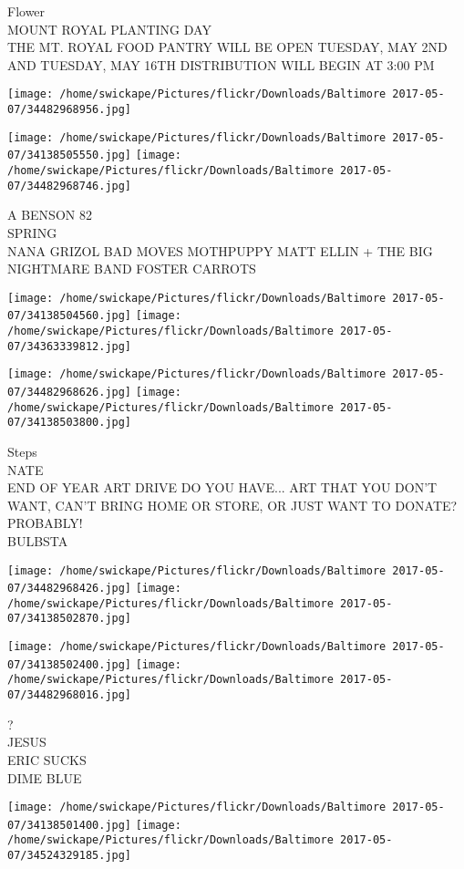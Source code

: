 \documentclass[10pt,letterpaper]{article}
\begin{document}
Flower\\
MOUNT ROYAL PLANTING DAY\\
THE MT. ROYAL FOOD PANTRY WILL BE OPEN TUESDAY, MAY 2ND AND TUESDAY, MAY 16TH DISTRIBUTION WILL BEGIN AT 3:00 PM
\pagebreak

\texttt{[image: /home/swickape/Pictures/flickr/Downloads/Baltimore 2017-05-07/34482968956.jpg]}

\vspace{0.25in}
\texttt{[image: /home/swickape/Pictures/flickr/Downloads/Baltimore 2017-05-07/34138505550.jpg]}
\texttt{[image: /home/swickape/Pictures/flickr/Downloads/Baltimore 2017-05-07/34482968746.jpg]}

A BENSON 82\\
SPRING\\
NANA GRIZOL BAD MOVES MOTHPUPPY MATT ELLIN + THE BIG NIGHTMARE BAND FOSTER CARROTS
\pagebreak

\texttt{[image: /home/swickape/Pictures/flickr/Downloads/Baltimore 2017-05-07/34138504560.jpg]}
\texttt{[image: /home/swickape/Pictures/flickr/Downloads/Baltimore 2017-05-07/34363339812.jpg]}

\texttt{[image: /home/swickape/Pictures/flickr/Downloads/Baltimore 2017-05-07/34482968626.jpg]}
\texttt{[image: /home/swickape/Pictures/flickr/Downloads/Baltimore 2017-05-07/34138503800.jpg]}

Steps\\
NATE\\
END OF YEAR ART DRIVE DO YOU HAVE... ART THAT YOU DON'T WANT, CAN'T BRING HOME OR STORE, OR JUST WANT TO DONATE?  PROBABLY!\\
BULBSTA
\pagebreak

\texttt{[image: /home/swickape/Pictures/flickr/Downloads/Baltimore 2017-05-07/34482968426.jpg]}
\texttt{[image: /home/swickape/Pictures/flickr/Downloads/Baltimore 2017-05-07/34138502870.jpg]}

\texttt{[image: /home/swickape/Pictures/flickr/Downloads/Baltimore 2017-05-07/34138502400.jpg]}
\texttt{[image: /home/swickape/Pictures/flickr/Downloads/Baltimore 2017-05-07/34482968016.jpg]}

?\\
JESUS\\
ERIC SUCKS\\
DIME BLUE
\pagebreak

\texttt{[image: /home/swickape/Pictures/flickr/Downloads/Baltimore 2017-05-07/34138501400.jpg]}
\texttt{[image: /home/swickape/Pictures/flickr/Downloads/Baltimore 2017-05-07/34524329185.jpg]}
\end{document}
